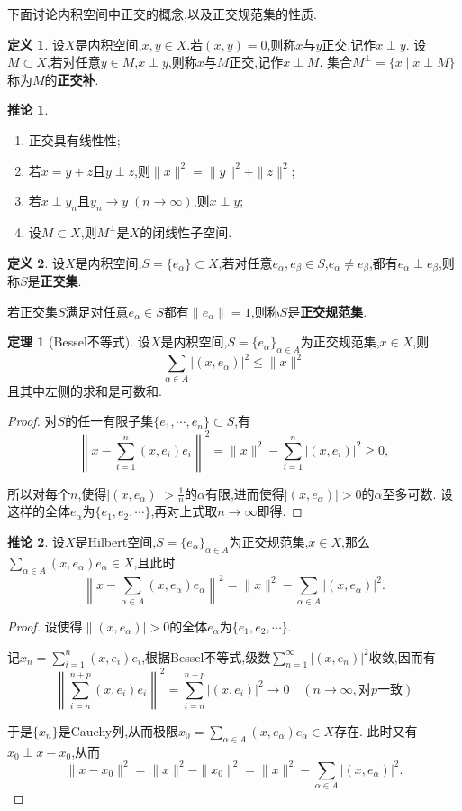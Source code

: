 \documentclass{ctexart}
\theoremstyle{definition}
\newtheorem{definition}{定义}
\newtheorem{theorem}{定理}
\newtheorem{corollary}{推论}
\theoremstyle{remark}
\begin{document}
	下面讨论内积空间中正交的概念,以及正交规范集的性质.
	\begin{definition}
		设$X$是内积空间,$x,y\in X$.若$(x,y)=0$,则称$x$与$y$正交,记作$x\perp y$.
		设$M\subset X$,若对任意$y\in M$,$x\perp y$,则称$x$与$M$正交,记作$x\perp M$.
		集合$M^\perp=\{x\mid x\perp M\}$称为$M$的\textbf{正交补}.
	\end{definition}
	\begin{corollary}
		\begin{enumerate}
			\item 正交具有线性性;
			\item 若$x=y+z$且$y\perp z$,则$\|x\|^2=\|y\|^2+\|z\|^2$;
			\item 若$x\perp y_n$且$y_n\to y\;(n\to\infty)$,则$x\perp y$;
			\item 设$M\subset X$,则$M^\perp$是$X$的闭线性子空间.
		\end{enumerate}
	\end{corollary}
	\begin{definition}
		设$X$是内积空间,$S=\{e_\alpha\}\subset X$,若对任意$e_\alpha,e_\beta\in S$,$e_\alpha\ne e_\beta$,都有$e_\alpha\perp e_\beta$,则称$S$是\textbf{正交集}.
		
		若正交集$S$满足对任意$e_\alpha\in S$都有$\|e_\alpha\|=1$,则称$S$是\textbf{正交规范集}.
	\end{definition}
	\begin{theorem}[Bessel不等式]
		设$X$是内积空间,$S=\{e_\alpha\}_{\alpha\in A}$为正交规范集,$x\in X$,则
		$$\sum_{\alpha\in A}{|(x,e_\alpha)|^2}\le\|x\|^2$$
		且其中左侧的求和是可数和.
	\end{theorem}
	\begin{proof}
		对$S$的任一有限子集$\{e_1,\cdots,e_n\}\subset S$,有
		$$\left\|x-\sum_{i=1}^n{(x,e_i)e_i}\right\|^2
		=\|x\|^2-\sum_{i=1}^n{|(x,e_i)|^2}\ge 0,$$
		
		所以对每个$n$,使得$|(x,e_\alpha)|>\frac{1}{n}$的$\alpha$有限,进而使得$|(x,e_\alpha)|>0$的$\alpha$至多可数.
		设这样的全体$e_\alpha$为$\{e_1,e_2,\cdots\}$,再对上式取$n\to\infty$即得.
	\end{proof}
	\begin{corollary}\label{corollary-orthonormal}
		设$X$是Hilbert空间,$S=\{e_\alpha\}_{\alpha\in A}$为正交规范集,$x\in X$,那么$\sum_{\alpha\in A}{(x,e_\alpha)e_\alpha}\in X$,且此时
		$$\left\|x-\sum_{\alpha\in A}{(x,e_\alpha)e_\alpha}\right\|^2=\|x\|^2-\sum_{\alpha\in A}{|(x,e_\alpha)|^2}.$$
	\end{corollary}
	\begin{proof}
		设使得$\|(x,e_\alpha)|>0$的全体$e_\alpha$为$\{e_1,e_2,\cdots\}$.
		
		记$x_n=\sum_{i=1}^n{(x,e_i)e_i}$,根据Bessel不等式,级数$\sum_{n=1}^\infty{|(x,e_n)|^2}$收敛,因而有
		$$\left\|\sum_{i=n}^{n+p}{(x,e_i)e_i}\right\|^2=\sum_{i=n}^{n+p}{|(x,e_i)|^2}\to 0\quad(n\to\infty,\mbox{对}p\mbox{一致})$$
		
		于是$\{x_n\}$是Cauchy列,从而极限$x_0=\sum_{\alpha\in A}{(x,e_\alpha)e_\alpha}\in X$存在.
		此时又有$x_0\perp x-x_0$,从而
		$$\|x-x_0\|^2=\|x\|^2-\|x_0\|^2=\|x\|^2-\sum_{\alpha\in A}{|(x,e_\alpha)|^2}.$$
	\end{proof}
\end{document}
